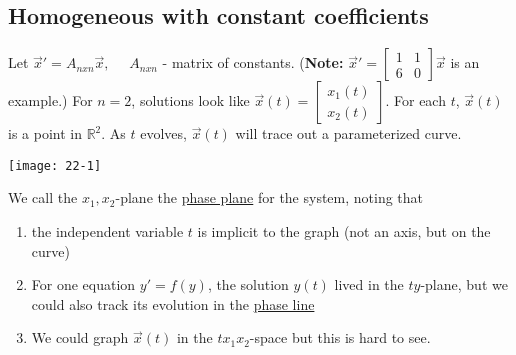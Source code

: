 \subsection*{Homogeneous with constant coefficients}
Let $\vec{x}' = A_{nxn} \vec{x}, \quad$ $A_{nxn}$ - matrix of constants. (\textbf{Note:} $\vec{x}' = \begin{bmatrix}
			1 & 1\\ 6 & 0
		\end{bmatrix} \vec{x}$ is an example.)
For $n=2$, solutions look like $\vec{x}(t) = \begin{bmatrix}
	x_1(t)\\ x_2(t)
\end{bmatrix}$. For each $t$, $\vec{x}(t)$ is a point in $\mathbb{R}^2$. As $t$ evolves, $\vec{x}(t)$ will trace out a parameterized curve.
\begin{center}
	\texttt{[image: 22-1]}
\end{center}
We call the $x_1, x_2$-plane the \underline{phase plane} for the system, noting that
\begin{enumerate}[label=\protect\circled{\alph*}]
	\item the independent variable $t$ is implicit to the graph (not an axis, but on the curve)
	\item For one equation $y' = f(y)$, the solution $y(t)$ lived in the $ty$-plane, but we could also track its evolution in the \underline{phase line}
	\item We could graph $\vec{x}(t)$ in the $tx_1 x_2$-space but this is hard to see.
\end{enumerate}
